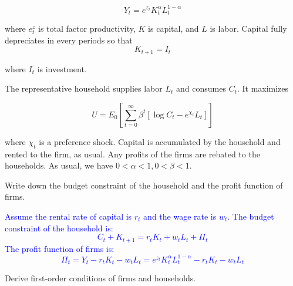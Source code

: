 $$Y_t=e^{z_t}K_t^\alpha L_t^{1-\alpha}$$

where $e^z_t$ is total factor productivity, $K$ is capital, and $L$ is labor. Capital fully depreciates in every
periods so that
$$K_{t+1}=I_t$$

where $I_{t}$ is investment.

The representative household supplies labor $L_t$ and consumes $C_t.$ It maximizes

$$U=E_0\left[\sum_{t=0}^\infty\beta^t\left[\log C_t-e^{\chi_t}L_t\right]\right]$$

where $\chi_t$ is a preference shock. Capital is accumulated by the household and rented to the firm, as usual.
Any profits of the firms are rebated to the households. As usual, we have $0<\alpha<1,0<\beta<1.$

\begin{problem*}[1]
    Write down the budget constraint of the household and the profit function of firms.
\end{problem*}

\begin{solution}
    \textcolor{blue}{
        Assume the rental rate of capital is $r_t$ and the wage rate is $w_t$.
        The budget constraint of the household is:
        \[
        C_t + K_{t+1} = r_t K_t + w_t L_t + \Pi_t
        \]
        The profit function of firms is:
        \[
        \Pi_t = Y_t - r_t K_t - w_t L_t = e^{z_t} K_t^\alpha L_t^{1-\alpha} - r_t K_t - w_t L_t
        \]
    }
\end{solution}

\begin{problem*}[2]
    Derive first-order conditions of firms and households.
\end{problem*}

